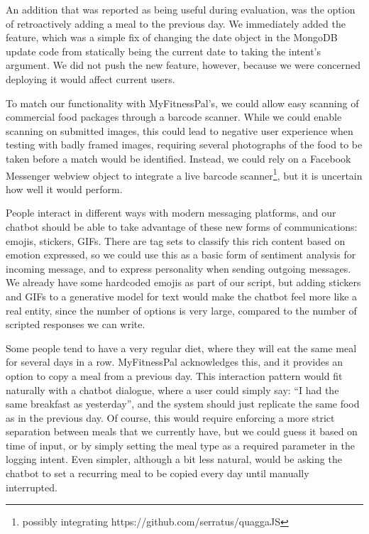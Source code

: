 An addition that was reported as being useful during evaluation, was the option of retroactively adding a meal to the previous day. We immediately added the feature, which was a simple fix of changing the date object in the MongoDB update code from statically being the current date to taking the intent's argument. We did not push the new feature, however, because we were concerned deploying it would affect current users. 

To match our functionality with MyFitnessPal's, we could allow easy scanning of commercial food packages through a barcode scanner. While we could enable scanning on submitted images, this could lead to negative user experience when testing with badly framed images, requiring several photographs of the food to be taken before a match would be identified. Instead, we could rely on a Facebook Messenger webview object to integrate a live barcode scanner\footnote{possibly integrating https://github.com/serratus/quaggaJS}, but it is uncertain how well it would perform. 

People interact in different ways with modern messaging platforms, and our chatbot should be able to take advantage of these new forms of communications: emojis, stickers, GIFs. There are tag sets to classify this rich content based on emotion expressed, so we could use this as a basic form of sentiment analysis for incoming message, and to express personality when sending outgoing messages. We already have some hardcoded emojis as part of our script, but adding stickers and GIFs to a generative model for text would make the chatbot feel more like a real entity, since the number of options is very large, compared to the number of scripted responses we can write. 

Some people tend to have a very regular diet, where they will eat the same meal for several days in a row. MyFitnessPal acknowledges this, and it provides an option to copy a meal from a previous day. This interaction pattern would fit naturally with a chatbot dialogue, where a user could simply say: ``I had the same breakfast as yesterday'', and the system should just replicate the same food as in the previous day. Of course, this would require enforcing a more strict separation between meals that we currently have, but we could guess it based on time of input, or by simply setting the meal type as a required parameter in the logging intent. Even simpler, although a bit less natural, would be asking the chatbot to set a recurring meal to be copied every day until manually interrupted. 

